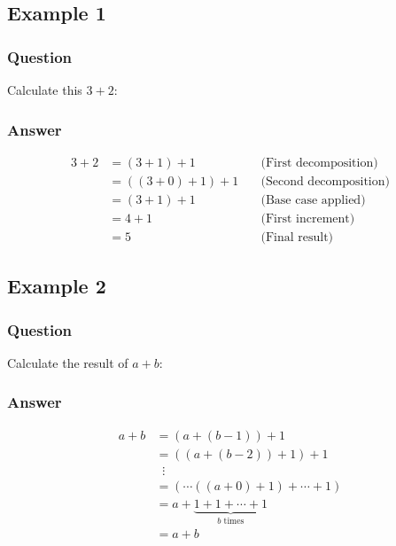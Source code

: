 \documentclass{article}
\begin{document}
\subsection{Example 1}
\subsubsection{Question}
Calculate this \(3 + 2\):
\subsubsection{Answer}
\[
    \begin{aligned}
        3 + 2 & = (3 + 1) + 1 \quad       & \text{(First decomposition)}  \\
              & = ((3 + 0) + 1) + 1 \quad & \text{(Second decomposition)} \\
              & = (3 + 1) + 1 \quad       & \text{(Base case applied)}    \\
              & = 4 + 1 \quad             & \text{(First increment)}      \\
              & = 5 \quad                 & \text{(Final result)}
    \end{aligned}
\]

\subsection{Example 2}
\subsubsection{Question}
Calculate the result of \(a + b\):
\subsubsection{Answer}
\[
    \begin{aligned}
        a + b & = (a + (b-1)) + 1                                       \\
              & = ((a + (b-2)) + 1) + 1                                 \\
              & \;\;\vdots                                              \\
              & = (\cdots((a + 0) + 1) + \cdots + 1)                    \\
              & = a + \underbrace{1 + 1 + \cdots + 1}_{b \text{ times}} \\
              & = a + b
    \end{aligned}
\]
\end{document}
